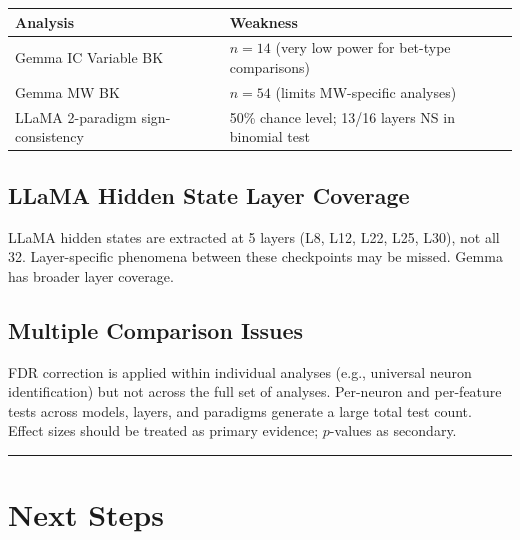 \documentclass[11pt,a4paper]{article}
\begin{document}
\begin{table}[H]
\centering
\footnotesize
\begin{tabular}{lp{9cm}}
\toprule
Analysis & Weakness \\
\midrule
Gemma IC Variable BK & $n=14$ (very low power for bet-type comparisons) \\
Gemma MW BK & $n=54$ (limits MW-specific analyses) \\
LLaMA 2-paradigm sign-consistency & 50\% chance level; 13/16 layers NS in binomial test \\
\bottomrule
\end{tabular}
\end{table}

\subsection{LLaMA Hidden State Layer Coverage}

LLaMA hidden states are extracted at 5 layers (L8, L12, L22, L25, L30), not all 32. Layer-specific phenomena between these checkpoints may be missed. Gemma has broader layer coverage.

\subsection{Multiple Comparison Issues}

FDR correction is applied within individual analyses (e.g., universal neuron identification) but not across the full set of analyses. Per-neuron and per-feature tests across models, layers, and paradigms generate a large total test count. Effect sizes should be treated as primary evidence; $p$-values as secondary.

\bigskip\hrule\bigskip

\section{Next Steps}
\end{document}
